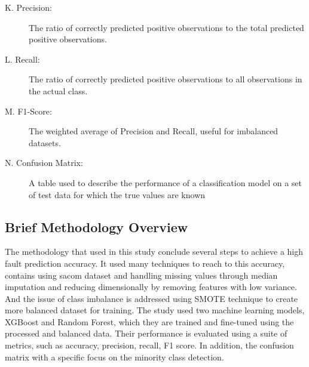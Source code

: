 \documentclass[12pt,oneside]{article}
\begin{document}
\begin{description}
        \item[\textcolor{DeepMaroon}{K. Precision: }]The ratio of correctly predicted positive observations to the total predicted positive observations.
        \item[\textcolor{DeepMaroon}{L. Recall:}]The ratio of correctly predicted positive observations to all observations in the actual class.
        \item[\textcolor{DeepMaroon}{M. F1-Score: }]The weighted average of Precision and Recall, useful for imbalanced datasets.
         \item[\textcolor{DeepMaroon}{N. Confusion Matrix: }]A table used to describe the performance of a classification model on a set of test data for which the true values are known
\end{description}

\subsection{Brief Methodology Overview}
The methodology that used in this study conclude several steps to achieve a high fault prediction accuracy. It used many techniques to reach to this accuracy, contains using sacom dataset and handling missing values through median imputation and reducing dimensionally by removing features with low variance. And the issue of class imbalance is addressed using SMOTE technique to create more balanced dataset for training. The study used two machine learning models, XGBoost and Random Forest, which they are trained and fine-tuned using the processed and balanced data. Their performance is evaluated using a suite of metrics, such as accuracy, precision, recall, F1 score. In addition, the confusion matrix with a specific focus on the minority class detection.
\end{document}
